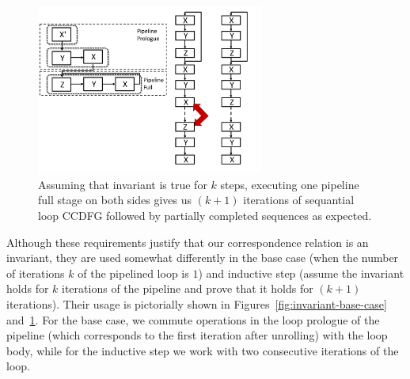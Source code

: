 \begin{figure}[t!]
\begin{center}
\includegraphics[height=2.2in]{fig-proposal/invariant-inductive-step}
\end{center}
\caption{Assuming that
  invariant is true for $k$ steps, executing one pipeline full
  stage on both sides gives us $(k + 1)$ iterations of
  sequantial loop CCDFG followed by partially completed
  sequences as expected.}
\label{fig:invariant-inductive-step}
\end{figure}

Although these requirements justify that our correspondence
relation is an invariant, they are used somewhat differently
in the base case (when the number of iterations $k$ of the
pipelined loop is $1$) and inductive step (assume the
invariant holds for $k$ iterations of the pipeline and prove
that it holds for $(k+ 1)$ iterations).  Their usage is
pictorially shown in Figures~\ref{fig:invariant-base-case}
and~\ref{fig:invariant-inductive-step}.  For
the base case, we commute operations in the loop prologue of
the pipeline (which corresponds to the first iteration after
unrolling) with the loop body, while for the inductive step
we work with two consecutive iterations of the loop.

